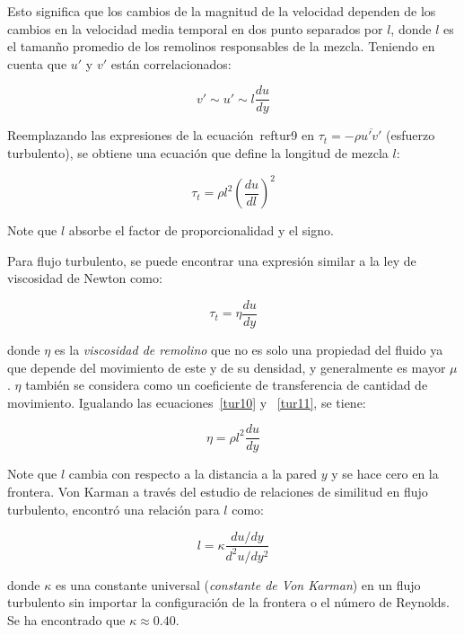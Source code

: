 \documentclass[11pt, oneside]{article}
\begin{document}
Esto significa que los cambios de la magnitud de la velocidad dependen de los cambios en la velocidad media temporal en dos punto separados por $l$, donde $l$  es el taman\~no promedio de los remolinos responsables de la mezcla. Teniendo en cuenta que $u'$ y $v'$ est\'an correlacionados:

\begin{equation}
v' \sim u' \sim l \frac{du}{dy}
\label{tur9}
\end{equation}

Reemplazando las expresiones de la ecuaci\'on~ref{tur9} en $\tau_t = -\rho \overline{u' v'}$ (esfuerzo turbulento), se obtiene una ecuaci\'on que define la longitud de mezcla $l$:

\begin{equation}
\tau_t = \rho l^2 \left( \frac{du}{dl} \right)^2
\label{tur10}
\end{equation}

Note que $l$ absorbe el factor de proporcionalidad y el signo. 

Para flujo turbulento, se puede encontrar una expresi\'on similar a la ley de viscosidad de Newton como:

\begin{equation}
\tau_t = \eta\frac{du}{dy}
\label{tur11}
\end{equation}

donde $\eta$ es la \emph{viscosidad de remolino} que no es solo una propiedad del fluido ya que depende del movimiento de este y de su densidad, y generalmente es mayor $\mu$. $\eta$ tambi\'en se considera como un coeficiente de transferencia de cantidad de movimiento. Igualando las ecuaciones~\ref{tur10} y ~\ref{tur11}, se tiene:

\begin{equation}
\eta=\rho l^2 \frac{du}{dy}
\label{tur12}
\end{equation}

Note que $l$ cambia con respecto a la distancia a la pared $y$ y se hace cero en la frontera. Von Karman a trav\'es del estudio de relaciones de similitud en flujo turbulento, encontr\'o una relaci\'on para $l$ como:

\begin{equation}
l= \kappa \frac{du/dy}{d^2 u / dy^2}
\label{tur13}
\end{equation}

donde $\kappa$ es una constante universal (\emph{constante de Von Karman}) en un flujo turbulento sin importar la configuraci\'on de la frontera o el n\'umero de Reynolds. Se ha encontrado que $\kappa \approx 0.40$.
\end{document}
